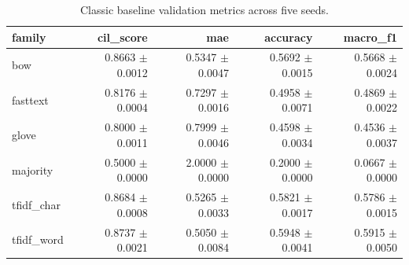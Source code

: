 \begin{table}[htbp]
\centering
\caption{Classic baseline validation metrics across five seeds.}
\label{tab:classic-seed-summary}
\begin{tabular}{lrrrr}
\toprule
family & cil\_score & mae & accuracy & macro\_f1 \\
\midrule
bow & 0.8663 $\pm$ 0.0012 & 0.5347 $\pm$ 0.0047 & 0.5692 $\pm$ 0.0015 & 0.5668 $\pm$ 0.0024 \\
fasttext & 0.8176 $\pm$ 0.0004 & 0.7297 $\pm$ 0.0016 & 0.4958 $\pm$ 0.0071 & 0.4869 $\pm$ 0.0022 \\
glove & 0.8000 $\pm$ 0.0011 & 0.7999 $\pm$ 0.0046 & 0.4598 $\pm$ 0.0034 & 0.4536 $\pm$ 0.0037 \\
majority & 0.5000 $\pm$ 0.0000 & 2.0000 $\pm$ 0.0000 & 0.2000 $\pm$ 0.0000 & 0.0667 $\pm$ 0.0000 \\
tfidf\_char & 0.8684 $\pm$ 0.0008 & 0.5265 $\pm$ 0.0033 & 0.5821 $\pm$ 0.0017 & 0.5786 $\pm$ 0.0015 \\
tfidf\_word & 0.8737 $\pm$ 0.0021 & 0.5050 $\pm$ 0.0084 & 0.5948 $\pm$ 0.0041 & 0.5915 $\pm$ 0.0050 \\
\bottomrule
\end{tabular}
\end{table}
